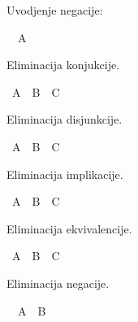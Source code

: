 \begin{isabellebody}
\begin{exercise}[subtitle=Intuicionistička pravila prirodne dedukcije u iskaznoj logici]
\begin{isamarkuptext}
Uvodjenje negacije: %
\end{isamarkuptext}\isamarkuptrue%
\isamarkupfalse%
\ {\isachardoublequoteopen}{\isasymnot}\ A{\isachardoublequoteclose}\isanewline
\ \ %
\isadelimproof
%
\endisadelimproof
%
\isatagproof
%
\endisatagproof
{\isafoldproof}%
%
\isadelimproof
%
\endisadelimproof
%
\begin{isamarkuptext}%
Eliminacija konjukcije. %
\end{isamarkuptext}\isamarkuptrue%
\isamarkupfalse%
\ {\isachardoublequoteopen}A\ {\isasymand}\ B\ {\isasymLongrightarrow}\ C{\isachardoublequoteclose}\isanewline
\ \ %
\isadelimproof
%
\endisadelimproof
%
\isatagproof
%
\endisatagproof
{\isafoldproof}%
%
\isadelimproof
%
\endisadelimproof
%
\begin{isamarkuptext}%
Eliminacija disjunkcije. %
\end{isamarkuptext}\isamarkuptrue%
\isamarkupfalse%
\ {\isachardoublequoteopen}A\ {\isasymor}\ B\ {\isasymLongrightarrow}\ C{\isachardoublequoteclose}\isanewline
\ \ %
\isadelimproof
%
\endisadelimproof
%
\isatagproof
%
\endisatagproof
{\isafoldproof}%
%
\isadelimproof
%
\endisadelimproof
%
\begin{isamarkuptext}%
Eliminacija implikacije. %
\end{isamarkuptext}\isamarkuptrue%
\isamarkupfalse%
\ {\isachardoublequoteopen}A\ {\isasymlongrightarrow}\ B\ {\isasymLongrightarrow}\ C{\isachardoublequoteclose}\isanewline
\ \ %
\isadelimproof
%
\endisadelimproof
%
\isatagproof
%
\endisatagproof
{\isafoldproof}%
%
\isadelimproof
%
\endisadelimproof
%
\begin{isamarkuptext}%
Eliminacija ekvivalencije. %
\end{isamarkuptext}\isamarkuptrue%
\isamarkupfalse%
\ {\isachardoublequoteopen}A\ {\isasymlongleftrightarrow}\ B\ {\isasymLongrightarrow}\ C{\isachardoublequoteclose}\isanewline
\ \ %
\isadelimproof
%
\endisadelimproof
%
\isatagproof
%
\endisatagproof
{\isafoldproof}%
%
\isadelimproof
%
\endisadelimproof
%
\begin{isamarkuptext}%
Eliminacija negacije. %
\end{isamarkuptext}\isamarkuptrue%
\isamarkupfalse%
\ {\isachardoublequoteopen}{\isasymnot}\ A\ {\isasymLongrightarrow}\ B{\isachardoublequoteclose}\ \isanewline
\ \ %
\isadelimproof
%
\endisadelimproof
%
\isatagproof
%
\endisatagproof
{\isafoldproof}%
%
\isadelimproof

\end{exercise}
\end{isabellebody}
